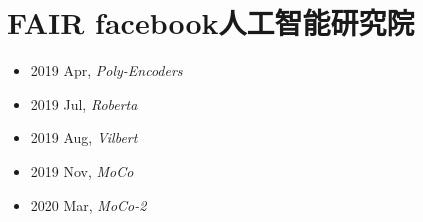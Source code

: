 \section{FAIR facebook人工智能研究院}\label{com:FAIR}

\begin{itemize}
    \item 2019 Apr, \textit{Poly-Encoders}\cite{Poly-Encoders}
    \item 2019 Jul, \textit{Roberta}\cite{Roberta}
    \item 2019 Aug, \textit{Vilbert}\cite{Vilbert}
    \item 2019 Nov, \textit{MoCo}\cite{MoCo}
    \item 2020 Mar, \textit{MoCo-2}\cite{MoCo-2}
\end{itemize}